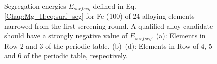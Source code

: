 \begingroup
\begin{figure}[!ht]
  \centering
  \label{Chap:Mg_H:fig:6a}
  \label{Chap:Mg_H:fig:6b}
  \\
  \label{Chap:Mg_H:fig:6c}
  \label{Chap:Mg_H:fig:6d}
\caption[Surface segregation energies for Fe (100) of 24 alloying elements]{Segregation energies $E_{surf seg}$ defined in Eq. \ref{Chap:Mg_H:eq:surf_seg} for Fe (100) of 24 alloying elements narrowed from the first screening round. A qualified alloy candidate should have a strongly negative value of $E_{surf seg}$. (a): Elements in Row 2 and 3 of the periodic table. (b)~(d): Elements in Row of 4, 5 and 6 of the periodic table, respectively.}
  \label{Chap:Mg_H:fig6}
\end{figure}
\endgroup

